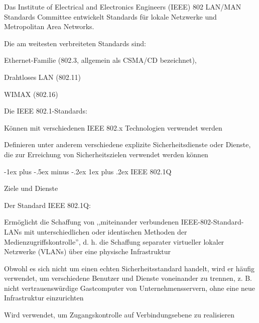 \documentclass[a4paper]{article}
\makeatletter
\renewcommand{\subsubsection}{\@startsection{subsubsection}{3}{0mm}%
 {-1ex plus -.5ex minus -.2ex}%
 {1ex plus .2ex}%
 {\normalfont\small\bfseries}}
\makeatother
\begin{document}
\begin{multicols}{3}
      \begin{itemize*}
            \item
            Das Institute of Electrical and Electronics Engineers (IEEE) 802
            LAN/MAN Standards Committee entwickelt Standards für lokale Netzwerke
            und Metropolitan Area Networks.
            \item
            Die am weitesten verbreiteten Standards sind:

            \begin{itemize*}
                  \item Ethernet-Familie (802.3, allgemein als CSMA/CD bezeichnet),
                  \item Drahtloses LAN (802.11)
                  \item WIMAX (802.16)
            \end{itemize*}
            \item
            Die IEEE 802.1-Standards:

            \begin{itemize*}
                  \item Können mit verschiedenen IEEE 802.x Technologien verwendet werden
                  \item Definieren unter anderem verschiedene explizite Sicherheitsdienste oder Dienste, die zur Erreichung von Sicherheitszielen verwendet werden können
            \end{itemize*}
      \end{itemize*}


      \subsubsection{IEEE 802.1Q}

      Ziele und Dienste

      \begin{itemize*}
            \item
            Der Standard IEEE 802.1Q:

            \begin{itemize*}
                  \item Ermöglicht die Schaffung von ,,miteinander verbundenen IEEE-802-Standard-LANs mit unterschiedlichen oder identischen Methoden der Medienzugriffskontrolle'', d. h. die Schaffung separater virtueller lokaler Netzwerke (VLANs) über eine physische Infrastruktur
                  \item Obwohl es sich nicht um einen echten Sicherheitsstandard handelt, wird er häufig verwendet, um verschiedene Benutzer und Dienste voneinander zu trennen, z. B. nicht vertrauenswürdige Gastcomputer von Unternehmensservern, ohne eine neue Infrastruktur einzurichten
                  \item Wird verwendet, um Zugangskontrolle auf Verbindungsebene zu realisieren
            \end{itemize*}
      \end{itemize*}


\end{multicols}
\end{document}
